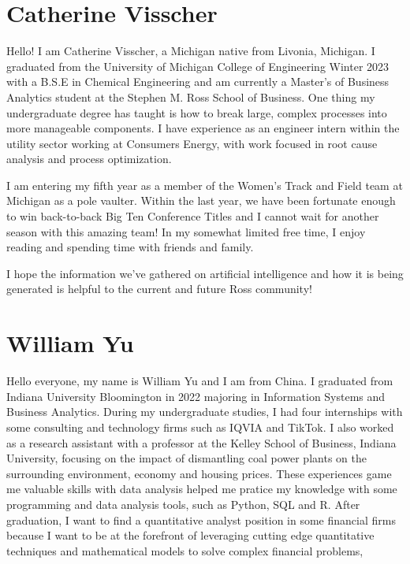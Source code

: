 \documentclass[
]{book}
\begin{document}
\hypertarget{catherine-visscher}{%
\section{Catherine Visscher}\label{catherine-visscher}}

Hello! I am Catherine Visscher, a Michigan native from Livonia, Michigan. I graduated from the University of Michigan College of Engineering Winter 2023 with a B.S.E in Chemical Engineering and am currently a Master's of Business Analytics student at the Stephen M. Ross School of Business. One thing my undergraduate degree has taught is how to break large, complex processes into more manageable components. I have experience as an engineer intern within the utility sector working at Consumers Energy, with work focused in root cause analysis and process optimization.

I am entering my fifth year as a member of the Women's Track and Field team at Michigan as a pole vaulter. Within the last year, we have been fortunate enough to win back-to-back Big Ten Conference Titles and I cannot wait for another season with this amazing team! In my somewhat limited free time, I enjoy reading and spending time with friends and family.

I hope the information we've gathered on artificial intelligence and how it is being generated is helpful to the current and future Ross community!

\hypertarget{william-yu}{%
\section{William Yu}\label{william-yu}}

Hello everyone, my name is William Yu and I am from China. I graduated from Indiana University Bloomington in 2022 majoring in Information Systems and Business Analytics. During my undergraduate studies, I had four internships with some consulting and technology firms such as IQVIA and TikTok. I also worked as a research assistant with a professor at the Kelley School of Business, Indiana University, focusing on the impact of dismantling coal power plants on the surrounding environment, economy and housing prices. These experiences game me valuable skills with data analysis helped me pratice my knowledge with some programming and data analysis tools, such as Python, SQL and R. After graduation, I want to find a quantitative analyst position in some financial firms because I want to be at the forefront of leveraging cutting edge quantitative techniques and mathematical models to solve complex financial problems,
\end{document}
